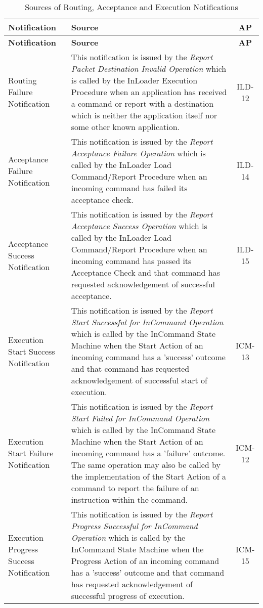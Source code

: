 \documentclass{pnp_article}
\begin{document}
\begin{longtable}{|>{\raggedright\arraybackslash}p{2.1cm}|>{\raggedright\arraybackslash}p{9.8cm}|c|}
\caption{Sources of Routing, Acceptance and Execution Notifications}\label{tab:sourcesNotif} \\
\hline
\rowcolor{light-gray}
\textbf{Notification} & \textbf{Source} & \textbf{AP} \\
\hline\hline
\endfirsthead
\rowcolor{light-gray}
\textbf{Notification} & \textbf{Source} & \textbf{AP} \\
\hline\hline
\endhead
Routing Failure Notification & This notification is issued by the \textit{Report Packet Destination Invalid Operation} which is called by the InLoader Execution Procedure when an application has received a command or report with a destination which is neither the application itself nor some other known application. & ILD-12 \\
\hline
Acceptance Failure Notification & This notification is issued by the \textit{Report Acceptance Failure Operation} which is called by the InLoader Load Command/Report Procedure when an incoming command has failed its acceptance check. & ILD-14 \\
\hline
Acceptance Success Notification & This notification is issued by the \textit{Report Acceptance Success Operation} which is called by the InLoader Load Command/Report Procedure when an incoming command has passed its Acceptance Check and that command has requested acknowledgement of successful acceptance. & ILD-15 \\
\hline
Execution Start Success Notification &  This notification is issued by the \textit{Report Start Successful for InCommand Operation} which is called by the InCommand State Machine when the Start Action of an incoming command has a 'success' outcome and that command has requested acknowledgement of successful start of execution. & ICM-13 \\
\hline 
Execution Start Failure Notification &  This notification is issued by the \textit{Report Start Failed for InCommand Operation} which is called by the InCommand State Machine when the Start Action of an incoming command has a 'failure' outcome. The same operation may also be called by the implementation of the Start Action of a command to report the failure of an instruction within the command. & ICM-12 \\
\hline
Execution Progress Success Notification &  This notification is issued by the \textit{Report Progress Successful for InCommand Operation} which is called by the InCommand State Machine when the Progress Action of an incoming command has a 'success' outcome and that command has requested acknowledgement of successful progress of execution. & ICM-15 \\

\end{longtable}
\end{document}
